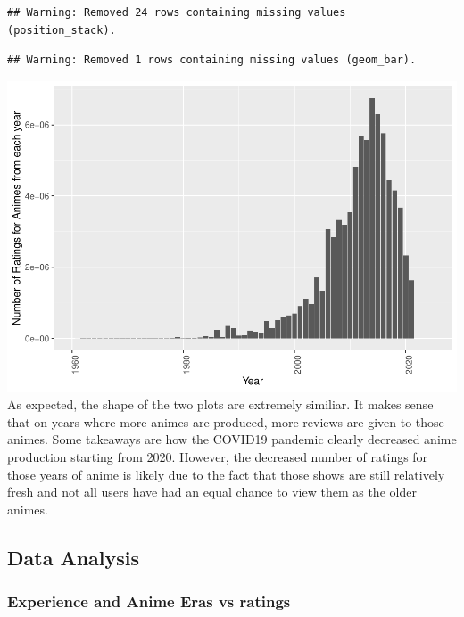 \documentclass[
]{article}
\begin{document}
\begin{verbatim}
## Warning: Removed 24 rows containing missing values (position_stack).
\end{verbatim}

\begin{verbatim}
## Warning: Removed 1 rows containing missing values (geom_bar).
\end{verbatim}

\includegraphics{R_analysis_files/figure-latex/unnamed-chunk-9-1.pdf} As
expected, the shape of the two plots are extremely similiar. It makes
sense that on years where more animes are produced, more reviews are
given to those animes. Some takeaways are how the COVID19 pandemic
clearly decreased anime production starting from 2020. However, the
decreased number of ratings for those years of anime is likely due to
the fact that those shows are still relatively fresh and not all users
have had an equal chance to view them as the older animes.

\hypertarget{data-analysis}{%
\subsection{Data Analysis}\label{data-analysis}}

\hypertarget{experience-and-anime-eras-vs-ratings}{%
\subsubsection{Experience and Anime Eras vs
ratings}\label{experience-and-anime-eras-vs-ratings}}
\end{document}
